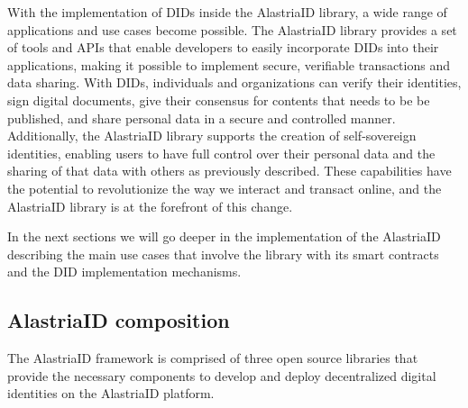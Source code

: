 \documentclass[target=mst,aauheader=]{thud}
\begin{document}
With the implementation of DIDs inside the AlastriaID library, a wide range of applications and use cases become possible. The AlastriaID library provides a set of tools and APIs that enable developers to easily incorporate DIDs into their applications, making it possible to implement secure, verifiable transactions and data sharing. With DIDs, individuals and organizations can verify their identities, sign digital documents, give their consensus for contents that needs to be be published, and share personal data in a secure and controlled manner. Additionally, the AlastriaID library supports the creation of self-sovereign identities, enabling users to have full control over their personal data and the sharing of that data with others as previously described. These capabilities have the potential to revolutionize the way we interact and transact online, and the AlastriaID library is at the forefront of this change.\par
In the next sections we will go deeper in the implementation of the AlastriaID describing the main use cases that involve the library with its smart contracts and the DID implementation mechanisms.

\subsection{AlastriaID composition}

The AlastriaID framework is comprised of three open source libraries that provide the necessary components to develop and deploy decentralized digital identities on the AlastriaID platform.
\end{document}
